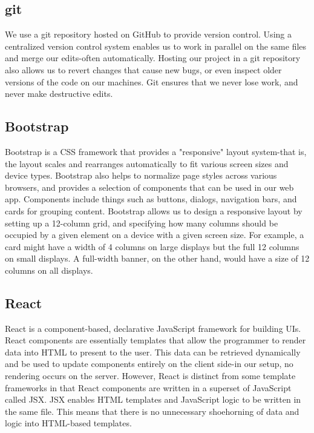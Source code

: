 \documentclass{scrartcl}
\begin{document}
    \subsection{git}\label{subsec:git}
    We use a git repository hosted on GitHub to provide version control.
    Using a centralized version control system enables us to work in parallel on the same files and merge our edits-often automatically.
    Hosting our project in a git repository also allows us to revert changes that cause new bugs, or even inspect older versions of the code on our machines.
    Git ensures that we never lose work, and never make destructive edits.

    \subsection{Bootstrap}\label{subsec:bootstrap}
    Bootstrap is a CSS framework that provides a "responsive" layout system-that is, the layout scales and rearranges automatically to fit various screen sizes and device types.
    Bootstrap also helps to normalize page styles across various browsers, and provides a selection of components that can be used in our web app.
    Components include things such as buttons, dialogs, navigation bars, and cards for grouping content.
    Bootstrap allows us to design a responsive layout by setting up a 12-column grid, and specifying how many columns should be occupied by a given element on a device with a given screen size.
    For example, a card might have a width of 4 columns on large displays but the full 12 columns on small displays.
    A full-width banner, on the other hand, would have a size of 12 columns on all displays.

    \subsection{React}\label{subsec:react}
    React is a component-based, declarative JavaScript framework for building UIs.
    React components are essentially templates that allow the programmer to render data into HTML to present to the user.
    This data can be retrieved dynamically and be used to update components entirely on the client side-in our setup, no rendering occurs on the server.
    However, React is distinct from some template frameworks in that React components are written in a superset of JavaScript called JSX.
    JSX enables HTML templates and JavaScript logic to be written in the same file.
    This means that there is no unnecessary shoehorning of data and logic into HTML-based templates.
\end{document}
